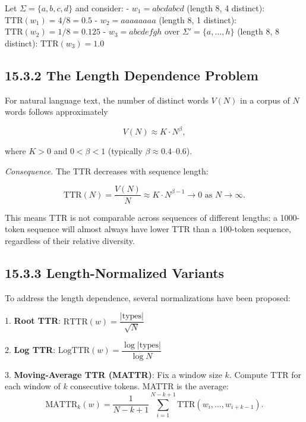 \begin{example}
Let $\Sigma = \{a, b, c, d\}$ and consider:
- $w_1 = abcdabcd$ (length 8, 4 distinct): $\mathrm{TTR}(w_1) = 4/8 = 0.5$
- $w_2 = aaaaaaaa$ (length 8, 1 distinct): $\mathrm{TTR}(w_2) = 1/8 = 0.125$
- $w_3 = abcdefgh$ over $\Sigma' = \{a,\ldots,h\}$ (length 8, 8 distinct): $\mathrm{TTR}(w_3) = 1.0$
\end{example}

\subsection{15.3.2 The Length Dependence Problem}

\begin{proposition}
For natural language text, the number of distinct words $V(N)$ in a corpus of $N$ words follows approximately

\[V(N) \approx K \cdot N^\beta,\]

where $K > 0$ and $0 < \beta < 1$ (typically $\beta \approx 0.4$--$0.6$).

\textit{Consequence.} The TTR decreases with sequence length:

\[\mathrm{TTR}(N) = \frac{V(N)}{N} \approx K \cdot N^{\beta - 1} \to 0 \text{ as } N \to \infty.\]

This means TTR is not comparable across sequences of different lengths: a 1000-token sequence will almost always have lower TTR than a 100-token sequence, regardless of their relative diversity.
\end{proposition}

\subsection{15.3.3 Length-Normalized Variants}

To address the length dependence, several normalizations have been proposed:

\begin{definition}

1. \textbf{Root TTR}: $\mathrm{RTTR}(w) = \dfrac{|\text{types}|}{\sqrt{N}}$

2. \textbf{Log TTR}: $\mathrm{LogTTR}(w) = \dfrac{\log|\text{types}|}{\log N}$

3. \textbf{Moving-Average TTR (MATTR)}: Fix a window size $k$. Compute TTR for each window of $k$ consecutive tokens. MATTR is the average:
\[\mathrm{MATTR}_k(w) = \frac{1}{N-k+1} \sum_{i=1}^{N-k+1} \mathrm{TTR}(w_i, \ldots, w_{i+k-1}).\]
\end{definition}

